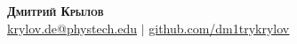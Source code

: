 \begin{center}
  \textbf{\Huge \scshape Дмитрий Крылов} \\ \vspace{1pt}
  \small \href{mailto:krylov.de@phystech.edu}{\underline{krylov.de@phystech.edu}} $|$
  \href{https://github.com/dm1trykrylov}{\underline{github.com/dm1trykrylov}}
\end{center}